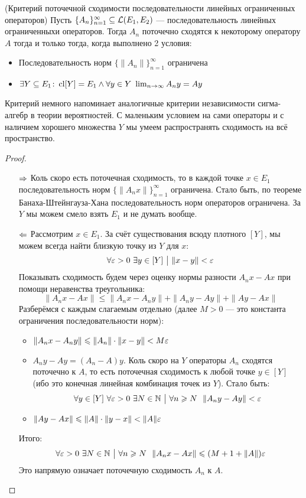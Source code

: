 \begin{theorem} (Критерий поточечной сходимости последовательности линейных ограниченных операторов)
	Пусть $\{A_n\}_{n = 1}^\infty \subseteq \mathcal{L}(E_1, E_2)$ --- последовательность линейных ограниченныхи операторов. Тогда $A_n$ поточечно сходятся к некоторому оператору $A$ тогда и только тогда, когда выполнено 2 условия:
	\begin{itemize}
		\item Последовательность норм $\{\|A_n\|\}_{n = 1}^\infty$ ограничена
		
		\item $\exists Y \subseteq E_1 \colon \operatorname{cl} [Y] = E_1 \wedge \forall y \in Y\ \lim_{n \to \infty} A_ny = Ay$
	\end{itemize}
\end{theorem}

\begin{anote}
	Критерий немного напоминает аналогичные критерии независимости сигма-алгебр в теории вероятностей. С маленьким условием на сами операторы и с наличием хорошего множества $Y$ мы умеем распространять сходимость на всё пространство.
\end{anote}

\begin{proof}~
	\begin{itemize}
		\item[$\Rightarrow$] Коль скоро есть поточечная сходимость, то в каждой точке $x \in E_1$ последовательность норм $\{\|A_nx\|\}_{n = 1}^\infty$ ограничена. Стало быть, по теореме Банаха-Штейнгауза-Хана последовательность норм операторов ограничена. За $Y$ мы можем смело взять $E_1$ и не думать вообще.
		
		\item[$\Leftarrow$] Рассмотрим $x \in E_1$. За счёт существования всюду плотного $[Y]$, мы можем всегда найти близкую точку из $Y$ для $x$:
		\[
			\forall \varepsilon > 0\ \exists y \in [Y] \ \big|\  \|x - y\| < \varepsilon
		\]
		Показывать сходимость будем через оценку нормы разности $A_nx - Ax$ при помощи неравенства треугольника:
		\[
			\|A_nx - Ax\| \le \|A_nx - A_ny\| + \|A_ny - Ay\| + \|Ay - Ax\|
		\]
		Разберёмся с каждым слагаемым отдельно (далее $M > 0$ --- это константа ограничения последовательности норм):
		\begin{itemize}
			\item $\|A_nx - A_ny\| \leqslant \|A_n\| \cdot \|x - y\| < M \varepsilon$
			
			\item $A_ny - Ay = (A_n - A)y$. Коль скоро на $Y$ операторы $A_n$ сходятся поточечно к $A$, то есть поточечная сходимость к любой точке $y \in [Y]$ (ибо это конечная линейная комбинация точек из $Y$). Стало быть:
			\[
				\forall y \in [Y]\ \forall \varepsilon > 0\ \exists N \in \mathbb{N} \ \big|\  \forall n \geqslant N\ \ \|A_ny - Ay\| < \varepsilon
			\]
			
			\item $\|Ay - Ax\| \leqslant \|A\| \cdot \|y - x\| < \|A\|\varepsilon$
		\end{itemize}
		Итого:
		\[
			\forall \varepsilon > 0\ \exists N \in \mathbb{N} \ \big|\  \forall n \geqslant N\ \ \|A_nx - Ax\| \leqslant (M + 1 + \|A\|)\varepsilon
		\]
		Это напрямую означает поточечную сходимость $A_n$ к $A$.
	\end{itemize}
\end{proof}

